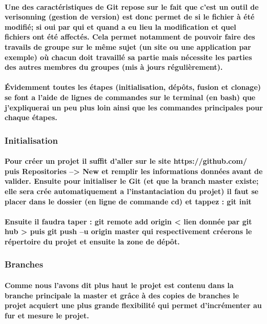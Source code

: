 \documentclass[a4paper, 12pt, twoside]{article}
\begin{document}
\paragraph{Une des caractéristiques de Git repose sur le fait que c'est un outil de verisonning (gestion de version) est donc permet de si le fichier
à été modifié; si oui par qui et quand a eu lieu la modification et quel fichiers ont été affectés. Cela permet notamment de pouvoir faire
des travails de groupe sur le même sujet (un site ou une application par exemple) où chacun doit travaillé sa partie mais nécessite les parties 
des autres membres du groupes (mis à jours régulièrement). }
\paragraph{Évidemment toutes les étapes (initialisation, dépôts, fusion et clonage) se font a l'aide de lignes de commandes sur le terminal (en bash)
que j'expliquerai un peu plus loin ainsi que les commandes principales pour chaque étapes.}
\subsubsection{Initialisation}
\paragraph*{ Pour créer un projet il suffit d'aller sur le site  https://github.com/ puis Repositories --> New et remplir les informations données avant
de valider. Ensuite pour initialiser le Git (et que la branch master existe; elle sera crée automatiquement a l'instantaciation du projet) il 
faut se placer dans le dossier (en ligne de commande cd) et tappez :  git init}
\paragraph{Ensuite  il faudra taper :  git remote add origin < lien donnée par git hub >  puis  git push –u origin master  qui respectivement créerons le répertoire du projet et ensuite la zone de dépôt.}

\subsubsection{Branches}
\paragraph{Comme nous l'avons dit plus haut le projet est contenu dans la branche principale la master et grâce à des copies de branches le projet 
acquiert une plus grande flexibilité qui permet d'incrémenter au fur et mesure le projet.}
\end{document}
